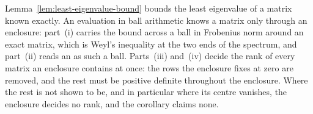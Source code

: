 
Lemma~\ref{lem:least-eigenvalue-bound} bounds the least eigenvalue of a
matrix known exactly. An evaluation in ball arithmetic knows a matrix only
through an enclosure: part~(i) carries the bound across a ball in Frobenius
norm around an exact matrix, which is Weyl's inequality at the two ends of the
spectrum, and part~(ii) reads an  as such a ball.
Parts~(iii) and~(iv) decide the rank of every matrix an enclosure contains at
once: the rows the enclosure fixes at zero are removed, and the rest must be
positive definite throughout the enclosure. Where the rest is not shown to be,
and in particular where its centre vanishes, the enclosure decides no rank,
and the corollary claims none.

